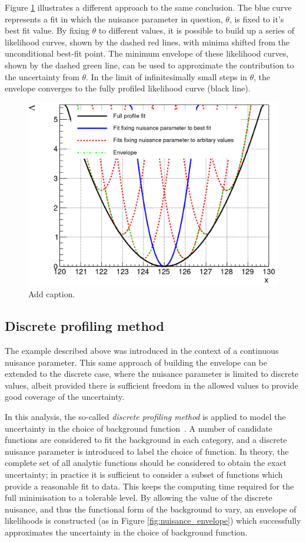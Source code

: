 Figure \ref{fig:nuisance_illustration} illustrates a different approach to the same conclusion. The blue curve represents a fit in which the nuisance parameter in question, $\theta$, is fixed to it's best fit value. By fixing $\theta$ to different values, it is possible to build up a series of likelihood curves, shown by the dashed red lines, with minima shifted from the unconditional best-fit point. The minimum envelope of these likelihood curves, shown by the dashed green line, can be used to approximate the contribution to the uncertainty from $\theta$. In the limit of infinitesimally small steps in $\theta$, the envelope converges to the fully profiled likelihood curve (black line).

\begin{figure}[hptb]
  \centering
  \includegraphics[width=.8\textwidth]{Figures/hgg_stats/nuisance_illustration.png}
  \caption[Constructing the envelope]
  {
    Add caption.
  }
  \label{fig:nuisance_illustration}
\end{figure}

\subsection{Discrete profiling method}
The example described above was introduced in the context of a continuous nuisance parameter. This same approach of building the envelope can be extended to the discrete case, where the nuisance parameter is limited to discrete values, albeit provided there is sufficient freedom in the allowed values to provide good coverage of the uncertainty.

In this analysis, the so-called \textit{discrete profiling method} is applied to model the uncertainty in the choice of background function~\cite{Dauncey:2014xga}. A number of candidate functions are considered to fit the background in each category, and a discrete nuisance parameter is introduced to label the choice of function. In theory, the complete set of all analytic functions should be considered to obtain the exact uncertainty; in practice it is sufficient to consider a subset of functions which provide a reasonable fit to data. This keeps the computing time required for the full minimisation to a tolerable level. By allowing the value of the discrete nuisance, and thus the functional form of the background to vary, an envelope of likelihoods is constructed (as in Figure \ref{fig:nuisance_envelope}) which successfully approximates the uncertainty in the choice of background function.

